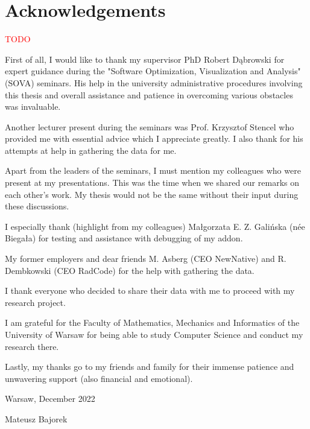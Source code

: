\chapter*{Acknowledgements}
\textcolor{red}{TODO}

First of all, I would like to thank my supervisor PhD Robert Dąbrowski for expert guidance during the "Software Optimization, Visualization and Analysis" (SOVA) seminars. His help in the university administrative procedures involving this thesis and overall assistance and patience in overcoming various obstacles was invaluable. 

Another lecturer present during the seminars was Prof. Krzysztof Stencel who provided me with essential advice which I appreciate greatly. I also thank for his attempts at help in gathering the data for me.

Apart from the leaders of the seminars, I must mention my colleagues who were present at my presentations. This was the time when we shared our remarks on each other's work. My thesis would not be the same without their input during these discussions.

I especially thank (highlight from my colleagues) Małgorzata E. Z. Galińska (née Biegała) for testing and assistance with debugging of my addon.

My former employers and dear friends M. Asberg (CEO NewNative) and R. Dembkowski (CEO RadCode) for the help with gathering the data.

I thank everyone who decided to share their data with me to proceed with my research project.

I am grateful for the Faculty of Mathematics, Mechanics and Informatics of the University of Warsaw for being able to study Computer Science and conduct my research there.

Lastly, my thanks go to my friends and family for their immense patience and unwavering support (also financial and emotional).

\begin{flushright}
Warsaw, December 2022

Mateusz Bajorek
\end{flushright}
